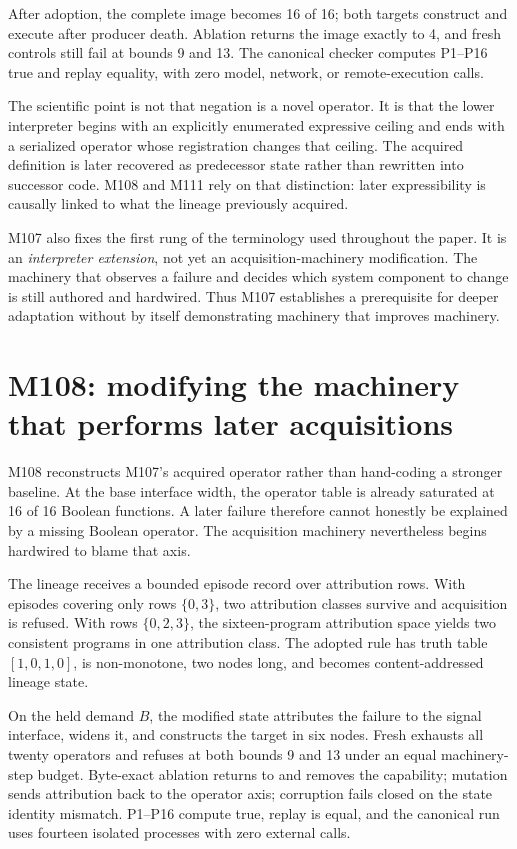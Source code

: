 After adoption, the complete image becomes 16 of 16; both targets construct and execute after producer death. Ablation returns the image exactly to 4, and fresh controls still fail at bounds 9 and 13. The canonical checker computes P1--P16 true and replay equality, with zero model, network, or remote-execution calls.

The scientific point is not that negation is a novel operator. It is that the lower interpreter begins with an explicitly enumerated expressive ceiling and ends with a serialized operator whose registration changes that ceiling. The acquired definition is later recovered as predecessor state rather than rewritten into successor code. M108 and M111 rely on that distinction: later expressibility is causally linked to what the lineage previously acquired.

M107 also fixes the first rung of the terminology used throughout the paper. It is an \emph{interpreter extension}, not yet an acquisition-machinery modification. The machinery that observes a failure and decides which system component to change is still authored and hardwired. Thus M107 establishes a prerequisite for deeper adaptation without by itself demonstrating machinery that improves machinery.

\section{M108: modifying the machinery that performs later acquisitions}
\label{sec:m108}
M108 reconstructs M107's acquired operator rather than hand-coding a stronger baseline. At the base interface width, the operator table is already saturated at 16 of 16 Boolean functions. A later failure therefore cannot honestly be explained by a missing Boolean operator. The acquisition machinery nevertheless begins hardwired to blame that axis.

The lineage receives a bounded episode record over attribution rows. With episodes covering only rows $\{0,3\}$, two attribution classes survive and acquisition is refused. With rows $\{0,2,3\}$, the sixteen-program attribution space yields two consistent programs in one attribution class. The adopted rule has truth table $[1,0,1,0]$, is non-monotone, two nodes long, and becomes content-addressed lineage state.

On the held demand $B$, the modified state \mone attributes the failure to the signal interface, widens it, and constructs the target in six nodes. Fresh \mzero exhausts all twenty operators and refuses at both bounds 9 and 13 under an equal machinery-step budget. Byte-exact ablation returns to \mzero and removes the capability; mutation sends attribution back to the operator axis; corruption fails closed on the state identity mismatch. P1--P16 compute true, replay is equal, and the canonical run uses fourteen isolated processes with zero external calls.

